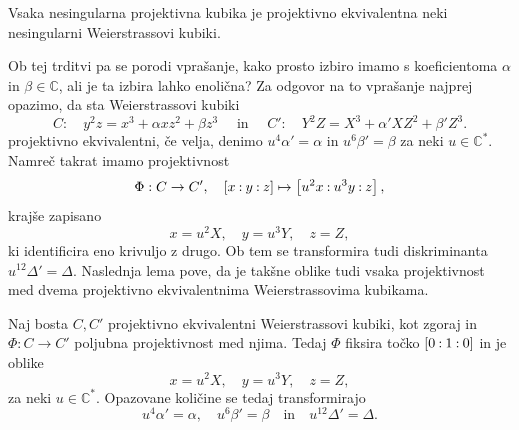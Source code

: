 \documentclass[mat1]{fmfdelo}
\numberwithin{equation}{section}
\newcommand{\C}{\mathbb C}
\newcommand{\CM}{\mathbb C ^*}
\newcommand{\pcoor}[1]{%
\begingroup\lccode`~=`: \lowercase{\endgroup
\edef~}{\mathbin{\mathchar\the\mathcode`:}\nobreak}%
\left[%
\begingroup
\mathcode`:=\string"8000
#1%
\endgroup
\right]%
}
\theoremstyle{definition}
\begin{document}

\begin{trditev}
    \label{kubika izomorfna neki wnf}
    Vsaka nesingularna projektivna kubika je projektivno ekvivalentna neki nesingularni Weierstrassovi kubiki.  
\end{trditev}

Ob tej trditvi pa se porodi vprašanje, kako prosto izbiro imamo s koeficientoma $\alpha$ in $\beta \in \C$, ali je ta izbira lahko enolična? Za odgovor na to vprašanje najprej opazimo, da sta Weierstrassovi kubiki 
\[
    C: \quad y^2z = x^3 + \alpha xz^2 + \beta z^3 \quad \text{ in } \quad
    C': \quad Y^2Z = X^3 + \alpha' XZ^2 + \beta' Z^3. 
\]
projektivno ekvivalentni, če velja, denimo $u^4 \alpha' = \alpha$ in $u^6 \beta' = \beta$ za neki $u \in \CM$. Namreč takrat imamo projektivnost
\begin{align*}
    \Phi:C \to C', \quad
    \pcoor{x : y : z} \mapsto \pcoor{u^2x : u^3y : z},
\end{align*}
krajše zapisano 
\[
    x = u^2 X, \quad y = u^3 Y, \quad z = Z,  
\]
ki identificira eno krivuljo z drugo. Ob tem se transformira tudi diskriminanta $u^{12} \Delta' = \Delta$. Naslednja lema pove, da je takšne oblike tudi vsaka projektivnost med dvema projektivno ekvivalentnima Weierstrassovima kubikama. 
        
\begin{lema}
    \label{projektivnosti wnf}
    Naj bosta $C, C'$ projektivno ekvivalentni Weierstrassovi kubiki, kot zgoraj in $\Phi: C \to C'$ poljubna projektivnost med njima. Tedaj $\Phi$ fiksira točko $\pcoor{0 : 1 : 0}$ in je oblike
    \begin{equation}
        \label{eq:transformacija wnf}
        x = u^2 X, \quad y = u^3 Y, \quad z = Z,  
    \end{equation}
    za neki $u \in \CM$. Opazovane količine se tedaj transformirajo 
    \begin{equation}
        \label{eq:transformacija koeficientov in diskriminante}
        u^4 \alpha' = \alpha, \quad u^6 \beta' = \beta \quad \text{in} \quad u^{12} \Delta' = \Delta.
    \end{equation}
\end{lema}
\end{document}
